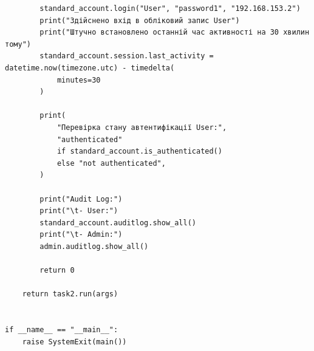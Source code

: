 \documentclass[10pt, a4paper]{article}
\begin{document}
\begin{lstlisting}
        standard_account.login("User", "password1", "192.168.153.2")
        print("Здійснено вхід в обліковий запис User")
        print("Штучно встановлено останній час активності на 30 хвилин тому")
        standard_account.session.last_activity = datetime.now(timezone.utc) - timedelta(
            minutes=30
        )

        print(
            "Перевірка стану автентифікації User:",
            "authenticated"
            if standard_account.is_authenticated()
            else "not authenticated",
        )

        print("Audit Log:")
        print("\t- User:")
        standard_account.auditlog.show_all()
        print("\t- Admin:")
        admin.auditlog.show_all()

        return 0

    return task2.run(args)


if __name__ == "__main__":
    raise SystemExit(main())
\end{lstlisting}
\end{document}
